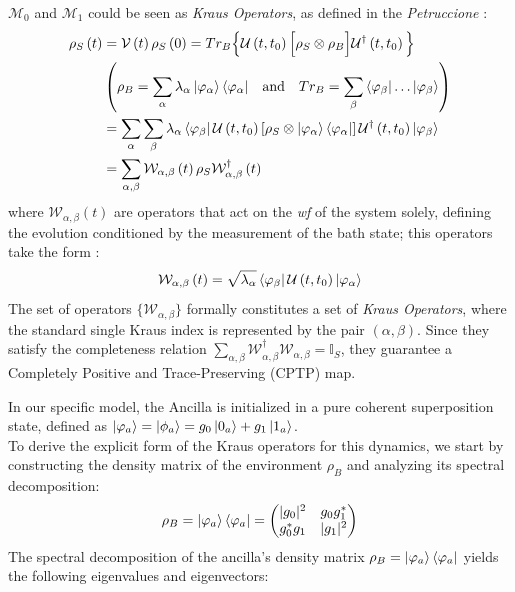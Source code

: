 \documentclass[a4paper,12pt]{article}
\begin{document}
\label{subsub:Kraus_Operators}
$ \mathcal{M}_0 $ and $ \mathcal{M}_1 $ could be seen as \textit{Kraus Operators}, as defined in the \textit{Petruccione} :
\begin{align}
	\rho_{S} \left(t\right) &= \mathcal{V}\left(t\right) \rho_{S} \left(0\right) = Tr_{B} \Big\{ \mathcal{U}\left(t, t_0\right) \Big[ \rho_{S} \otimes \rho_{B} \Big] \mathcal{U}^{\dagger}\left(t, t_0\right) \Big\} \\
	&\left( \rho_{B} = \sum_{\alpha}{\lambda_{\alpha} \ket{\varphi_{\alpha}} \bra{\varphi_{\alpha}}} \quad \text{and} \quad Tr_{B} = \sum_{\beta}{\bra{\varphi_{\beta}} \dots \ket{\varphi_{\beta}}} \right) \notag \\
	&= \sum_{\alpha}{\sum_{\beta}{\lambda_{\alpha}\bra{\varphi_{\beta}} \mathcal{U}\left(t, t_0\right) \left[ \rho_{S} \otimes \ket{\varphi_{\alpha}} \bra{\varphi_{\alpha}} \right]  \mathcal{U}^{\dagger}\left(t, t_0\right) \ket{\varphi_{\beta}} }} \notag \\
	&= \sum_{\alpha, \beta}{ \mathcal{W}_{\alpha, \beta} \left(t\right) \rho_{S} \mathcal{W}^{\dagger}_{\alpha, \beta} \left(t\right) }
	\label{eq:dynamical_map_kraus_operators}
\end{align}
where $ \mathcal{W}_{\alpha, \beta} \left(t\right) $ are operators that act on the \textit{wf} of the system solely, defining the evolution conditioned by the measurement of the bath state; this operators take the form :
\begin{equation}
	\mathcal{W}_{\alpha, \beta} \left(t\right) = \sqrt{\lambda_{\alpha}} \bra{\varphi_{\beta}}  \mathcal{U}\left(t, t_0\right) \ket{\varphi_{\alpha}}
	\label{eq:general_kraus_operators}
\end{equation}
The set of operators $\{ \mathcal{W}_{\alpha, \beta} \}$ formally constitutes a set of \textit{Kraus Operators}, where the standard single Kraus index is represented by the pair $(\alpha, \beta)$. Since they satisfy the completeness relation $\sum_{\alpha, \beta} \mathcal{W}_{\alpha, \beta}^\dagger \mathcal{W}_{\alpha, \beta} = \mathbb{I}_S$, they guarantee a Completely Positive and Trace-Preserving (CPTP) map.

\newpage

In our specific model, the Ancilla is initialized in a pure coherent superposition state, defined as $\ket{\varphi_{a}} =  \ket{\phi_a} = g_0 \ket{0_a} + g_1 \ket{1_a}$. \\
To derive the explicit form of the Kraus operators for this dynamics, we start by constructing the density matrix of the environment $\rho_B$ and analyzing its spectral decomposition:
\begin{equation}
	\rho_B = \ket{\varphi_a}\bra{\varphi_a} =
	\begin{pmatrix}
	|g_0|^2 & g_0 g_1^* \\
	g_0^* g_1 & |g_1|^2
	\end{pmatrix}
\end{equation}
The spectral decomposition of the ancilla's density matrix $\rho_B = \ket{\varphi_{a}}\bra{\varphi_{a}}$ yields the following eigenvalues and eigenvectors:
\end{document}

